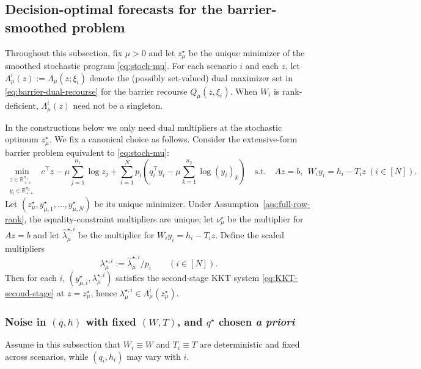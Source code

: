 \documentclass[11pt]{article}
\theoremstyle{plain}
\theoremstyle{definition}
\theoremstyle{remark}
\begin{document}
\subsection{Decision-optimal forecasts for the barrier-smoothed problem}\label{subsec:existence:mu}

Throughout this subsection, fix $\mu>0$ and let $z_\mu^\star$ be the unique minimizer of the smoothed
stochastic program \eqref{eq:stoch-mu}. For each scenario $i$ and each $z$, let
$\Lambda_\mu^i(z):=\Lambda_\mu(z;\xi_i)$ denote the (possibly set-valued) dual maximizer set in
\eqref{eq:barrier-dual-recourse} for the barrier recourse $Q_\mu(z,\xi_i)$. When $W_i$ is rank-deficient,
$\Lambda_\mu^i(z)$ need not be a singleton.

In the constructions below we only need dual multipliers at the stochastic optimum $z_\mu^\star$.
We fix a canonical choice as follows. Consider the extensive-form barrier problem equivalent to
\eqref{eq:stoch-mu}:
\[
\min_{\substack{z\in\mathbb{R}^{n_1}_{++}\\ y_i\in\mathbb{R}^{n_2}_{++}}}
\ c^\top z - \mu\sum_{j=1}^{n_1}\log z_j
+\sum_{i=1}^N p_i\left(q_i^\top y_i-\mu\sum_{k=1}^{n_2}\log (y_i)_k\right)
\quad\text{s.t.}\quad
Az=b,\ \ W_i y_i = h_i - T_i z\ (i\in[N]).
\]
Let $(z_\mu^\star,y_{\mu,1}^\star,\dots,y_{\mu,N}^\star)$ be its unique minimizer. Under
Assumption~\ref{ass:full-row-rank}, the equality-constraint multipliers are unique; let $\nu_\mu^\star$
be the multiplier for $Az=b$ and let $\widehat\lambda_{\mu}^{\star,i}$ be the multiplier for
$W_i y_i = h_i - T_i z$. Define the scaled multipliers
\[
\lambda_{\mu}^{\star,i} := \widehat\lambda_{\mu}^{\star,i}/p_i \qquad (i\in[N]).
\]
Then for each $i$, $(y_{\mu,i}^\star,\lambda_{\mu}^{\star,i})$ satisfies the second-stage KKT system
\eqref{eq:KKT-second-stage} at $z=z_\mu^\star$, hence $\lambda_{\mu}^{\star,i}\in\Lambda_\mu^i(z_\mu^\star)$.

\subsubsection[Noise in (q,h) with fixed (W,T), and q* chosen a priori]{Noise in $(q,h)$ with fixed $(W,T)$, and \texorpdfstring{$q^\star$}{q*} chosen \emph{a priori}}\label{subsec:qh-fixedWT}

Assume in this subsection that $W_i\equiv W$ and $T_i\equiv T$ are deterministic and fixed across scenarios,
while $(q_i,h_i)$ may vary with $i$.
\end{document}
